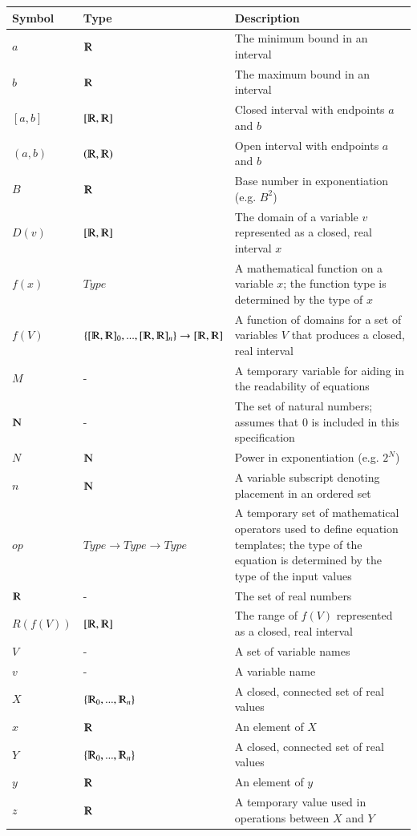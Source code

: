 \documentclass[12pt]{article}
\begin{document}
\renewcommand{\arraystretch}{1.2}
\noindent \begin{longtable*}{m{1.5cm} m{5.3cm} m{8.2cm}} \toprule
\textbf{Symbol}  & \textbf{Type} & \textbf{Description}\\
\midrule 
\endhead
$a$ & $\varmathbb{R}$ & The minimum bound in an interval\\
$b$ & $\varmathbb{R}$ & The maximum bound in an interval\\
$[a,b]$ & $[\varmathbb{R}, \varmathbb{R}]$ & Closed interval with endpoints $a$ 
and $b$\\
$(a,b)$ & $(\varmathbb{R}, \varmathbb{R})$ & Open interval with endpoints $a$ 
and $b$\\
$B$ & $\varmathbb{R}$ & Base number in exponentiation (e.g. $B^2$)\\
$D(v)$ & $[\varmathbb{R}, \varmathbb{R}]$ & The domain of a variable $v$ 
represented as a closed, real interval $x$\\
$f(x)$ & $Type$ & A mathematical function on a variable $x$; the 
function type is determined by the type of $x$\\
$f(V)$ & $\{[\varmathbb{R}, \varmathbb{R}]_0, ..., [\varmathbb{R}, 
\varmathbb{R}]_n\} \rightarrow [\varmathbb{R}, 
\varmathbb{R}]$ & A function of domains for a set of variables $V$ that 
produces a closed, real interval\\
$M$ & - & A temporary variable for aiding in the readability of equations\\
$\varmathbb{N}$ & - & The set of natural numbers; assumes that $0$ is included 
in this specification\\
$N$ & $\varmathbb{N}$ & Power in exponentiation (e.g. $2^N$) \\
$n$ & $\varmathbb{N}$ & A variable subscript denoting placement in an ordered 
set\\
$op$ & $Type \rightarrow Type \rightarrow Type$ & A temporary set of 
mathematical operators used to define equation templates; the type of the 
equation is determined by the type of the input values\\
$\varmathbb{R}$ & - & The set of real numbers\\
$R(f(V))$ & $[\varmathbb{R}, \varmathbb{R}]$ & The range of $f(V)$ represented 
as a closed, real interval\\
$V$ & - & A set of variable names\\
$v$ & - & A variable name\\
$X$ & $\{\varmathbb{R}_0, ..., \varmathbb{R}_n\}$ & A closed, connected set of 
real values\\
$x$ & $\varmathbb{R}$ & An element of $X$\\
$Y$ & $\{\varmathbb{R}_0, ..., \varmathbb{R}_n\}$ & A closed, connected set of 
real values\\
$y$ & $\varmathbb{R}$ & An element of $y$\\
$z$ & $\varmathbb{R}$ & A temporary value used in operations between $X$ and 
$Y$\\
\bottomrule
\end{longtable*}
\end{document}
